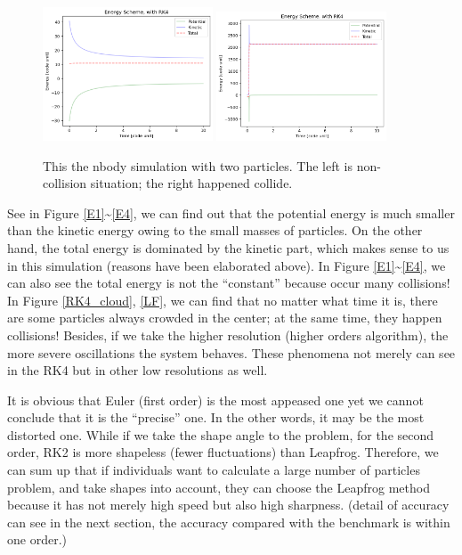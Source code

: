 \documentclass[12pt]{article}
\begin{document}
    \begin{figure}[H]
        \centering 
        \includegraphics[width = 0.45\textwidth]{./RK4/part2_no_collision.png}
        \includegraphics[width = 0.45\textwidth]{./RK4/part2_collision.png} 
        \caption{This the {\ttfamily nbody} simulation with two particles. The left is non-collision situation; the right happened collide.}
        \label{collision}
    \end{figure}

    See in Figure \ref{E1}\textasciitilde\ref{E4}, we can find out that the potential energy is much smaller than the kinetic energy owing to the small masses of particles. On the other hand, the total energy is dominated by the kinetic part, which makes sense to us in this simulation (reasons have been elaborated above). In Figure \ref{E1}\textasciitilde\ref{E4}, we can also see the total energy is not the ``constant'' because occur many collisions! In Figure \ref{RK4_cloud}, \ref{LF}, we can find that no matter what time it is, there are some particles always crowded in the center; at the same time, they happen collisions! Besides, if we take the higher resolution (higher orders algorithm), the more severe oscillations the system behaves. These phenomena not merely can see in the RK4 but in other low resolutions as well. 
    
    It is obvious that Euler (first order) is the most appeased one yet we cannot conclude that it is the ``precise'' one. In the other words, it may be the most distorted one. While if we take the shape angle to the problem, for the second order, RK2 is more shapeless (fewer fluctuations) than Leapfrog. Therefore, we can sum up that if individuals want to calculate a large number of particles problem, and take shapes into account, they can choose the Leapfrog method because it has not merely high speed but also high sharpness. (detail of accuracy can see in the next section, the accuracy compared with the benchmark is within one order.)
\end{document}
